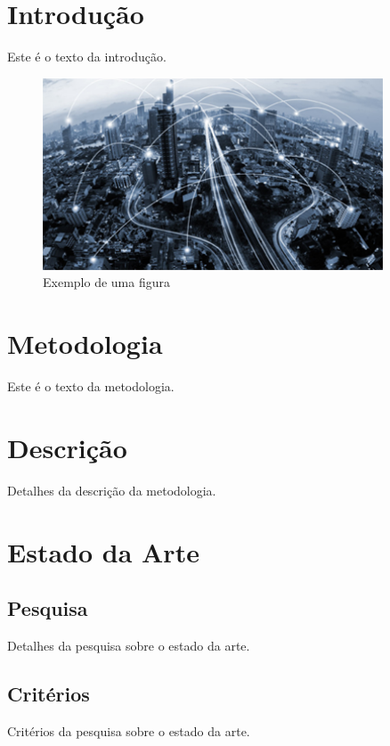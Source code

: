 \documentclass[12pt,a4paper,final]{article}
\begin{document}
    \section{Introdução}\label{sec:introducao}
    Este é o texto da introdução.

    \begin{figure}[h!]
        \centering
        \includegraphics[width=0.9\textwidth]{img_meitw}
        \caption{Exemplo de uma figura}
        \label{fig:exemplo}
    \end{figure}

    \section{Metodologia}\label{sec:metodologia}
    Este é o texto da metodologia.

    \section{Descrição}\label{sec:descricao}
    Detalhes da descrição da metodologia.

    \section{Estado da Arte}\label{sec:estado-da-arte}

    \subsection{Pesquisa}\label{subsec:pesquisa}
    Detalhes da pesquisa sobre o estado da arte.

    \subsection{Critérios}\label{subsec:criterios}
    Critérios da pesquisa sobre o estado da arte.
\end{document}
